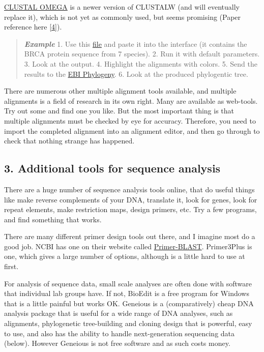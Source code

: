 \documentclass[]{article}
\begin{document}
\href{https://www.ebi.ac.uk/Tools/msa/clustalo/}{CLUSTAL OMEGA} is a
newer version of CLUSTALW (and will eventually replace it), which is not
yet as commonly used, but seems promising (Paper reference here
{[}\href{http://msb.embopress.org/content/7/1/539}{4}{]}).

\begin{quote}
\emph{\textbf{Example}} 1. Use this
\href{http://compbio.massey.ac.nz/wiki/data/c1/BRCA2_aa.fasta}{file} and
paste it into the interface (it contains the BRCA protein sequence from
7 species). 2. Run it with default parameters. 3. Look at the output. 4.
Highlight the alignments with colors. 5. Send the results to the
\href{https://www.ebi.ac.uk/Tools/phylogeny/clustalw2_phylogeny/}{EBI
Phylogeny}. 6. Look at the produced phylogentic tree.
\end{quote}

There are numerous other multiple alignment tools available, and
multiple alignments is a field of research in its own right. Many are
available as web-tools. Try out some and find one you like. But the most
important thing is that multiple alignments must be checked by eye for
accuracy. Therefore, you need to import the completed alignment into an
alignment editor, and then go through to check that nothing strange has
happened.

\subsection{3. Additional tools for sequence
analysis}\label{additional-tools-for-sequence-analysis}

There are a huge number of sequence analysis tools online, that do
useful things like make reverse complements of your DNA, translate it,
look for genes, look for repeat elements, make restriction maps, design
primers, etc. Try a few programs, and find something that works.

There are many different primer design tools out there, and I imagine
most do a good job. NCBI has one on their website called
\href{http://www.ncbi.nlm.nih.gov/tools/primer-blast/}{Primer-BLAST}.
Primer3Plus is one, which gives a large number of options, although is a
little hard to use at first.

For analysis of sequence data, small scale analyses are often done with
software that individual lab groups have. If not, BioEdit is a free
program for Windows that is a little painful but works OK. Geneious is a
(comparatively) cheap DNA analysis package that is useful for a wide
range of DNA analyses, such as alignments, phylogenetic tree-building
and cloning design that is powerful, easy to use, and also has the
ability to handle next-generation sequencing data (below). However
Geneious is not free software and as such costs money.
\end{document}

